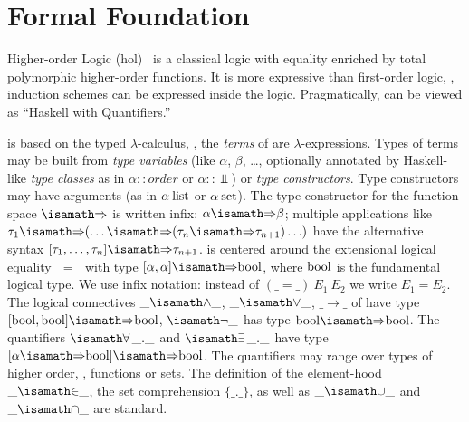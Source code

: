 \section{Formal Foundation}
Higher-order Logic
(\acs{hol})~\cite{church:types:1940,andrews:introduction:2002} is a
classical logic with equality enriched by total polymorphic
higher-order functions. It is more expressive than first-order logic,
\eg, induction schemes can be expressed inside the
logic. Pragmatically, \HOL can be viewed as ``Haskell with
Quantifiers.''

\HOL is based on the typed $\lambda$-calculus, \ie, the \emph{terms} of \HOL are
$\lambda$-expressions.  Types of terms may be built from \emph{type
  variables} (like $\alpha$, $\beta$, \ldots, optionally
annotated by Haskell-like \emph{type classes} as in
$\alpha::order$ or $\alpha::\Bot$) or \emph{type constructors}. Type constructors may have arguments (as in $\alpha\:\mathrm{list}$
or $\alpha\:\mathrm{set}$). The type constructor for the function space
$\isasymRightarrow$ is written infix: $\alpha \isasymRightarrow \beta$; multiple
applications like
$\tau_1\isasymRightarrow(\ldots\isasymRightarrow(\tau_n\isasymRightarrow\tau_{n+1})\ldots)$
have the alternative syntax $[\tau_1, \ldots, \tau_n] \isasymRightarrow
\tau_{n+1}$. \HOL is centered around the extensional logical equality $\_=\_$
with type $[\alpha, \alpha] \isasymRightarrow \HolBoolean$, where $\mathrm{bool}$
is the fundamental logical type.  We use infix notation: instead of
$(\_=\_)~E_1~E_2$ we write $E_1=E_2$. The logical connectives $\_\isasymand\_$,
$\_\isasymor\_$, $\_\to\_$ of \HOL have type $[\HolBoolean, \HolBoolean]
\isasymRightarrow \HolBoolean$, $\isasymnot\_$ has type $\HolBoolean
\isasymRightarrow \HolBoolean$. The quantifiers $\isasymforall\_.\_$ and
$\isasymexists\_.\_$ have type $[\alpha \isasymRightarrow \HolBoolean]
\isasymRightarrow \HolBoolean$. The quantifiers may range over types of higher
order, \ie, functions or sets. 
The definition of the element-hood $\_\isasymin\_$, the set comprehension
$\{\_.\_\}$, as well as $\_\isasymunion\_$ and $\_\isasyminter\_$ are standard.


